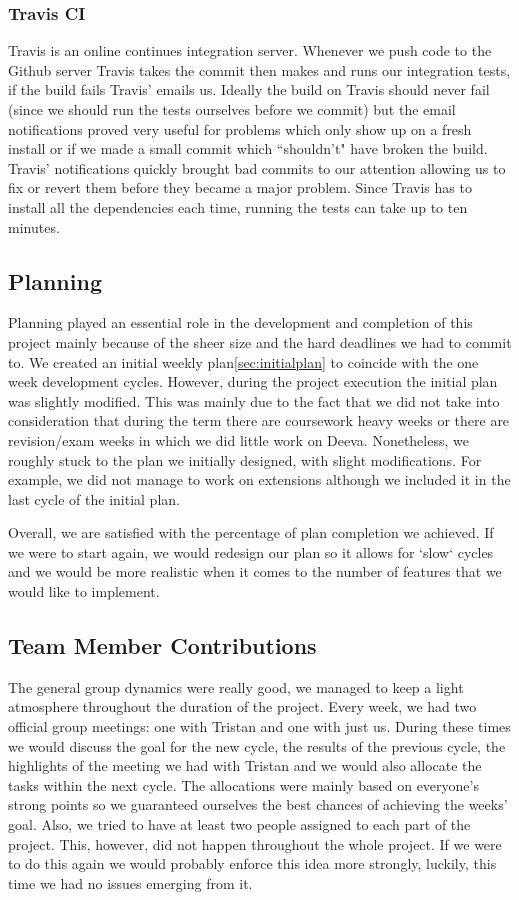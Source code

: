 \documentclass[11pt, a4paper]{article}
\begin{document}
\subsubsection{Travis CI}
Travis\cite{TravisCI} is an online continues integration server.
Whenever we push code to the Github server Travis takes the commit then makes and runs our integration tests, if the build fails Travis' emails us.
Ideally the build on Travis should never fail (since we should run the tests ourselves before we commit) but the email notifications proved very useful for problems which only show up on a fresh install or if we made a small commit which ``shouldn't" have broken the build.
Travis' notifications quickly brought bad commits to our attention allowing us to fix or revert them before they became a major problem.
Since Travis has to install all the dependencies each time, running the tests can take up to ten minutes.

\subsection{Planning}
Planning played an essential role in the development and completion of this project mainly because of the sheer size and the hard deadlines we had to commit to.
We created an initial weekly plan\ref{sec:initialplan} to coincide with the one week development cycles.
However, during the project execution the initial plan was slightly modified.
This was mainly due to the fact that we did not take into consideration that during the term there are coursework heavy weeks or there are revision/exam weeks in which we did little work on Deeva.
Nonetheless, we roughly stuck to the plan we initially designed, with slight modifications.
For example, we did not manage to work on extensions although we included it in the last cycle of the initial plan.

Overall, we are satisfied with the percentage of plan completion we achieved.
If we were to start again, we would redesign our plan so it allows for `slow` cycles and we would be more realistic when it comes to the number of features that we would like to implement.

\subsection{Team Member Contributions}

The general group dynamics were really good, we managed to keep a light atmosphere throughout the duration of the project.
Every week, we had two official group meetings: one with Tristan and one with just us.
During these times we would discuss the goal for the new cycle, the results of the previous cycle, the highlights of the meeting we had with Tristan and we would also allocate the tasks within the next cycle.
The allocations were mainly based on everyone's strong points so we guaranteed ourselves the best chances of achieving the weeks' goal.
Also, we tried to have at least two people assigned to each part of the project.
This, however, did not happen throughout the whole project.
If we were to do this again we would probably enforce this idea more strongly, luckily, this time we had no issues emerging from it.
\end{document}

